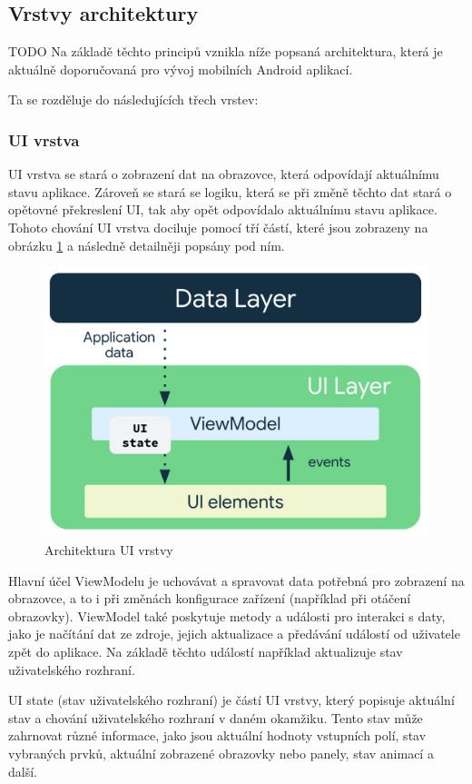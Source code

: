 \subsection{Vrstvy architektury} \label{vrstvyArchitekturySection} 
TODO %
Na základě těchto principů vznikla níže popsaná architektura, která je aktuálně doporučovaná pro vývoj mobilních Android aplikací.

Ta se rozděluje do následujících třech vrstev:

\subsubsection*{UI vrstva} \label{UILayerNavrh}
UI vrstva se stará o zobrazení dat na obrazovce, která odpovídají aktuálnímu stavu aplikace. Zároveň se stará se logiku, která
se při změně těchto dat stará o opětovné překreslení UI, tak aby opět odpovídalo aktuálnímu stavu aplikace. Tohoto chování UI vrstva 
dociluje pomocí tří částí, které jsou zobrazeny na obrázku \ref{fig:arch_ui_udf} a následně detailněji popsány pod ním.

\begin{figure}[H]
  \centering
  \includegraphics[width=.5\textwidth]{arch-ui-udf.png}
  \caption{Architektura UI vrstvy}
  \label{fig:arch_ui_udf}
\end{figure}

Hlavní účel ViewModelu je uchovávat a spravovat data potřebná pro zobrazení na obrazovce, a to i při změnách konfigurace zařízení 
(například při otáčení obrazovky). ViewModel také poskytuje metody a události pro interakci s daty, jako je načítání dat ze zdroje, 
jejich aktualizace a předávání událostí od uživatele zpět do aplikace. Na základě těchto událostí například aktualizuje stav uživatelského
rozhraní. %

 \label{UIStateParagraph}
UI state (stav uživatelského rozhraní) je částí UI vrstvy, který popisuje aktuální stav a chování uživatelského 
rozhraní v daném okamžiku. Tento stav může zahrnovat různé informace, jako jsou aktuální hodnoty vstupních polí, stav vybraných prvků,
 aktuální zobrazené obrazovky nebo panely, stav animací a další.

